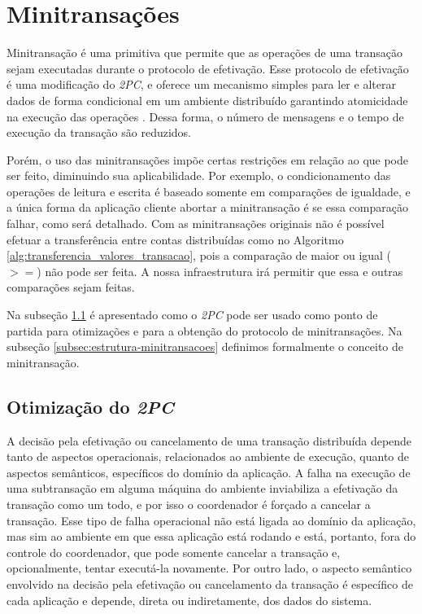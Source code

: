 \documentclass[11pt,twoside,a4paper]{book}
\begin{document}
\section{Minitransações}
\label{sec:minitransacoes}
Minitransação é uma primitiva que permite que as operações de uma transação sejam executadas durante o protocolo de efetivação. Esse protocolo de efetivação é uma modificação do \emph{2PC}, e oferece um mecanismo simples para ler e alterar dados de forma condicional em um ambiente distribuído garantindo atomicidade na execução das operações \cite{sinfonia}. Dessa forma, o número de mensagens e o tempo de execução da transação são reduzidos. 

Porém, o uso das minitransações impõe certas restrições em relação ao que pode ser feito, diminuindo sua aplicabilidade. Por exemplo, o condicionamento das operações de leitura e escrita é baseado somente em comparações de igualdade, e a única forma da aplicação cliente abortar a minitransação é se essa comparação falhar, como será detalhado. Com as minitransações originais não é possível efetuar a transferência entre contas distribuídas como no Algoritmo \ref{alg:transferencia_valores_transacao}, pois a comparação de maior ou igual ($>=$) não pode ser feita. A nossa infraestrutura irá permitir que essa e outras comparações sejam feitas.

Na subseção \ref{subsec:derivando-minitransacoes} é apresentado como o \emph{2PC} pode ser usado como ponto de partida para otimizações e para a obtenção do protocolo de minitransações. Na subseção \ref{subsec:estrutura-minitransacoes} definimos formalmente o conceito de minitransação.

\subsection{Otimização do \emph{2PC}}
\label{subsec:derivando-minitransacoes}
A decisão pela efetivação ou cancelamento de uma transação distribuída depende tanto de aspectos operacionais, relacionados ao ambiente de execução, quanto de aspectos semânticos, específicos do domínio da aplicação. A falha na execução de uma subtransação em alguma máquina do ambiente inviabiliza a efetivação da transação como um todo, e por isso o coordenador é forçado a cancelar a transação. Esse tipo de falha operacional não está ligada ao domínio da aplicação, mas sim ao ambiente em que essa aplicação está rodando e está, portanto, fora do controle do coordenador, que pode somente cancelar a transação e, opcionalmente, tentar executá-la novamente. Por outro lado, o aspecto semântico envolvido na decisão pela efetivação ou cancelamento da transação é específico de cada aplicação e depende, direta ou indiretamente, dos dados do sistema.
\end{document}
